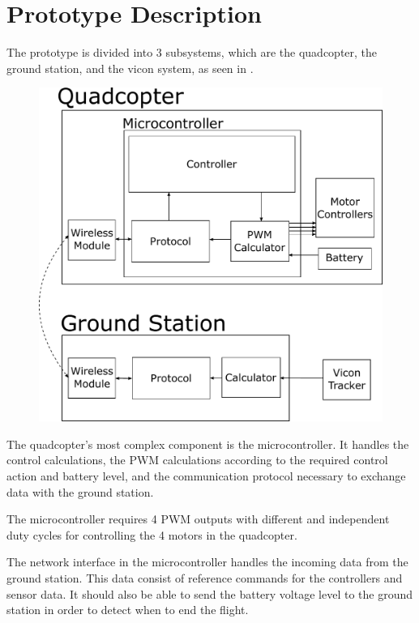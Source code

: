 \section{Prototype Description}

The prototype is divided into 3 subsystems, which are the quadcopter, the ground station, and the vicon system, as seen in . 

\begin{figure}[H] 
	\includegraphics[scale=.5]{figures/prototypediagram}
	\centering
	\captionsetup{justification=centering}
	\label{prototypediagram}
\end{figure}

The quadcopter's most complex component is the microcontroller. It handles the control calculations, the PWM calculations according to the required control action and battery level, and the communication protocol necessary to exchange data with the ground station.

The microcontroller requires 4 PWM outputs with different and independent duty cycles for controlling the 4 motors in the quadcopter. 

The network interface in the microcontroller handles the incoming data from the ground station. This data consist of reference commands for the controllers and sensor data. It should also be able to send the battery voltage level to the ground station in order to detect when to end the flight.

